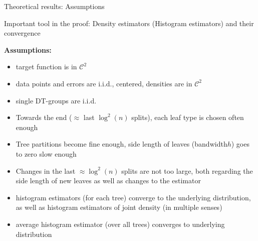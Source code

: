 \documentclass{beamer}
\begin{document}
\begin{frame}{Theoretical results: Assumptions}

    Important tool in the proof: Density estimators (Histogram estimators) and their convergence
    
    \textbf{Assumptions:}
    \begin{itemize}
        \item target function is in \(\mathcal{C}^2\)
        \item data points and errors are i.i.d., centered, densities are in \(\mathcal{C}^2\)
        \item single DT-groups are i.i.d.
        \item Towards the end (\(\approx\) last \(\log^2(n)\) splits), each leaf type is chosen often enough
        \item Tree partitions become fine enough, side length of leaves (\grqq bandwidth\grqq \(h\)) goes to zero slow enough
        \item Changes in the last \(\approx \log^2(n)\) splits are not too large, both regarding the side length of new leaves as well as changes to the estimator
        \item histogram estimators (for each tree) converge to the underlying distribution, as well as histogram estimators of joint density (in multiple senses)
        \item average histogram estimator (over all trees) converges to underlying distribution
    \end{itemize}

    
\vspace{1cm}

\end{frame}
\end{document}
